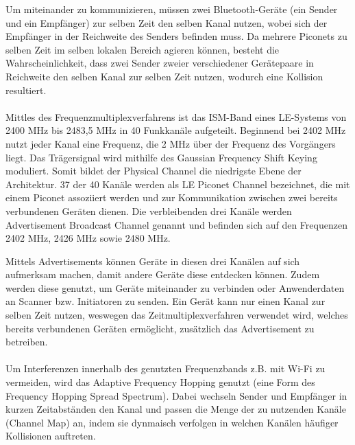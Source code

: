 Um miteinander zu kommunizieren, müssen zwei Bluetooth-Geräte (ein Sender und ein Empfänger) zur selben Zeit den selben Kanal nutzen, wobei sich der Empfänger in der Reichweite des Senders befinden muss. Da mehrere Piconets zu selben Zeit im selben lokalen Bereich agieren können, besteht die Wahrscheinlichkeit, dass zwei Sender zweier verschiedener Gerätepaare in Reichweite den selben Kanal zur selben Zeit nutzen, wodurch eine Kollision resultiert.
\\\\
Mittles des Frequenzmultiplexverfahrens ist das ISM-Band eines LE-Systems von 2400 MHz bis 2483,5 MHz in 40 Funkkanäle aufgeteilt. Beginnend bei 2402 MHz nutzt jeder Kanal eine Frequenz, die 2 MHz über der Frequenz des Vorgängers liegt.
Das Trägersignal wird mithilfe des Gaussian Frequency Shift Keying moduliert.
Somit bildet der Physical Channel die niedrigste Ebene der Architektur. 37 der 40 Kanäle werden als LE Piconet Channel bezeichnet, die mit einem Piconet assoziiert werden und zur Kommunikation zwischen zwei bereits verbundenen Geräten dienen. Die verbleibenden drei Kanäle werden Advertisement Broadcast Channel genannt und befinden sich auf den Frequenzen 2402 MHz, 2426 MHz sowie 2480 MHz.

Mittels Advertisements können Geräte in diesen drei Kanälen auf sich aufmerksam machen, damit andere Geräte diese entdecken können. Zudem werden diese genutzt, um Geräte miteinander zu verbinden oder Anwenderdaten an Scanner bzw. Initiatoren zu senden. Ein Gerät kann nur einen Kanal zur selben Zeit nutzen, weswegen das Zeitmultiplexverfahren verwendet wird, welches bereits verbundenen Geräten ermöglicht, zusätzlich das Advertisement zu betreiben.
\\\\
Um Interferenzen innerhalb des genutzten Frequenzbands z.B. mit Wi-Fi zu vermeiden, wird das Adaptive Frequency Hopping genutzt (eine Form des Frequency Hopping Spread Spectrum). Dabei wechseln Sender und Empfänger in kurzen Zeitabständen den Kanal und passen die Menge der zu nutzenden Kanäle (Channel Map) an, indem sie dynmaisch verfolgen in welchen Kanälen häufiger Kollisionen auftreten.

